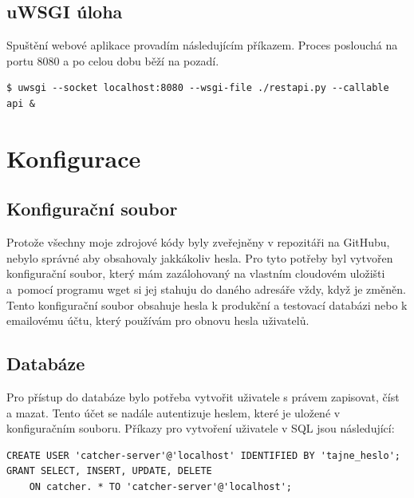 
\subsection*{uWSGI úloha}

\indent

Spuštění webové aplikace provadím následujícím příkazem. Proces poslouchá na portu 8080 a po celou dobu běží na pozadí.

\begingroup
\fontsize{9.5pt}{11pt}\selectfont
\begin{verbatim}
$ uwsgi --socket localhost:8080 --wsgi-file ./restapi.py --callable api &
\end{verbatim}
\endgroup

\section{Konfigurace}

\subsection*{Konfigurační soubor}

\indent

Protože všechny moje zdrojové kódy byly zveřejněny v repozitáři na GitHubu, nebylo správné aby obsahovaly jakkákoliv hesla.
Pro tyto potřeby byl vytvořen konfigurační soubor, který mám zazálohovaný na vlastním cloudovém uložišti
a~pomocí programu wget si jej stahuju do daného adresáře vždy, když je změněn.
Tento konfigurační soubor obsahuje hesla k produkční a testovací databázi
nebo k emailovému účtu, který používám pro obnovu hesla uživatelů.

\subsection*{Databáze}

\indent

Pro přístup do databáze bylo potřeba vytvořit uživatele s právem zapisovat, číst a mazat.
Tento účet se nadále autentizuje heslem, které je uložené v konfiguračním souboru.
Příkazy pro vytvoření uživatele v SQL jsou následující:

\begingroup
\fontsize{9.5pt}{11pt}\selectfont
\begin{verbatim}
CREATE USER 'catcher-server'@'localhost' IDENTIFIED BY 'tajne_heslo';
GRANT SELECT, INSERT, UPDATE, DELETE
    ON catcher. * TO 'catcher-server'@'localhost';
\end{verbatim}
\endgroup


